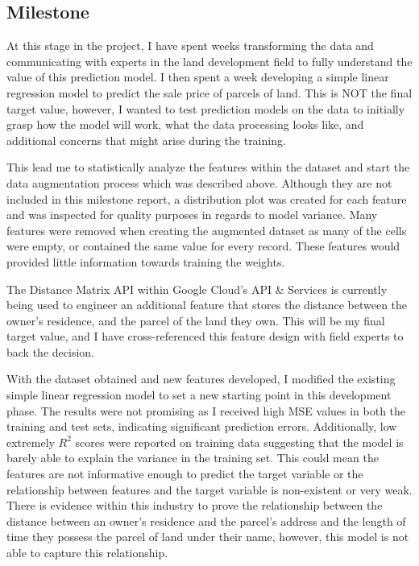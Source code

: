 \subsection{Milestone}

At this stage in the project, I have spent weeks transforming the data and communicating with experts in the land development field to fully understand the value of this prediction model. I then spent a week developing a simple linear regression model to predict the sale price of parcels of land. This is NOT the final target value, however, I wanted to test prediction models on the data to initially grasp how the model will work, what the data processing looks like, and additional concerns that might arise during the training.

This lead me to statistically analyze the features within the dataset and start the data augmentation process which was described above. Although they are not included in this milestone report, a distribution plot was created for each feature and was inspected for quality purposes in regards to model variance. Many features were removed when creating the augmented dataset as many of the cells were empty, or contained the same value for every record. These features would provided little information towards training the weights.

The Distance Matrix API within Google Cloud's API \& Services is currently being used to engineer an additional feature that stores the distance between the owner's residence, and the parcel of the land they own. This will be my final target value, and I have cross-referenced this feature design with field experts to back the decision.

With the dataset obtained and new features developed, I modified the existing simple linear regression model to set a new starting point in this development phase. The results were not promising as I received high MSE values in both the training and test sets, indicating significant prediction errors. Additionally, low extremely $R^2$ scores were reported on training data suggesting that the model is barely able to explain the variance in the training set. This could mean the features are not informative enough to predict the target variable or the relationship between features and the target variable is non-existent or very weak. There is evidence within this industry to prove the relationship between the distance between an owner's residence and the parcel's address and the length of time they possess the parcel of land under their name, however, this model is not able to capture this relationship.

